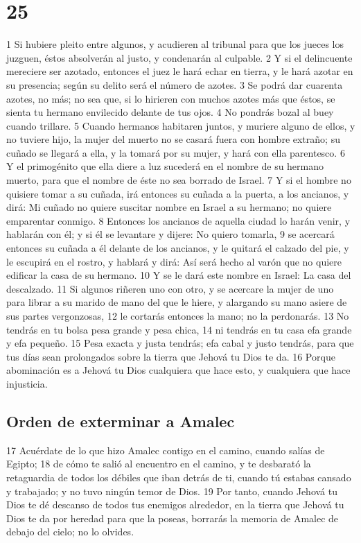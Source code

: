 \chapter{25}

1 Si hubiere pleito entre algunos, y acudieren al tribunal para que los jueces los juzguen, éstos absolverán al justo, y condenarán al culpable.
2 Y si el delincuente mereciere ser azotado, entonces el juez le hará echar en tierra, y le hará azotar en su presencia; según su delito será el número de azotes.
3 Se podrá dar cuarenta azotes, no más; no sea que, si lo hirieren con muchos azotes más que éstos, se sienta tu hermano envilecido delante de tus ojos.
4 No pondrás bozal al buey cuando trillare.
5 Cuando hermanos habitaren juntos, y muriere alguno de ellos, y no tuviere hijo, la mujer del muerto no se casará fuera con hombre extraño; su cuñado se llegará a ella, y la tomará por su mujer, y hará con ella parentesco.
6 Y el primogénito que ella diere a luz sucederá en el nombre de su hermano muerto, para que el nombre de éste no sea borrado de Israel. 
7 Y si el hombre no quisiere tomar a su cuñada, irá entonces su cuñada a la puerta, a los ancianos, y dirá: Mi cuñado no quiere suscitar nombre en Israel a su hermano; no quiere emparentar conmigo.
8 Entonces los ancianos de aquella ciudad lo harán venir, y hablarán con él; y si él se levantare y dijere: No quiero tomarla,
9 se acercará entonces su cuñada a él delante de los ancianos, y le quitará el calzado del pie, y le escupirá en el rostro, y hablará y dirá: Así será hecho al varón que no quiere edificar la casa de su hermano.
10 Y se le dará este nombre en Israel: La casa del descalzado. 
11 Si algunos riñeren uno con otro, y se acercare la mujer de uno para librar a su marido de mano del que le hiere, y alargando su mano asiere de sus partes vergonzosas,
12 le cortarás entonces la mano; no la perdonarás.
13 No tendrás en tu bolsa pesa grande y pesa chica,
14 ni tendrás en tu casa efa   grande y efa pequeño.
15 Pesa exacta y justa tendrás; efa   cabal y justo tendrás, para que tus días sean prolongados sobre la tierra que Jehová tu Dios te da.
16 Porque abominación es a Jehová tu Dios cualquiera que hace esto, y cualquiera que hace injusticia. 

\section{Orden de exterminar a Amalec}

17 Acuérdate de lo que hizo Amalec contigo en el camino, cuando salías de Egipto;
18 de cómo te salió al encuentro en el camino, y te desbarató la retaguardia de todos los débiles que iban detrás de ti, cuando tú estabas cansado y trabajado; y no tuvo ningún temor de Dios.
19 Por tanto, cuando Jehová tu Dios te dé descanso de todos tus enemigos alrededor, en la tierra que Jehová tu Dios te da por heredad para que la poseas, borrarás la memoria de Amalec de debajo del cielo; no lo olvides. 

